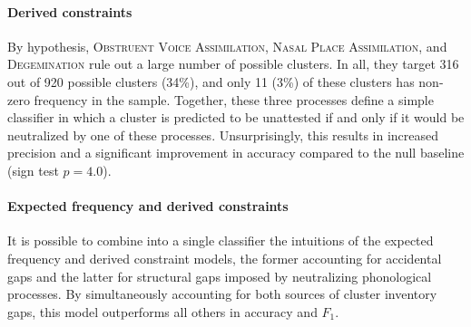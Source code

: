 \paragraph{Derived constraints} 
By hypothesis, \textsc{Obstruent Voice Assimilation}, \textsc{Nasal Place Assimilation}, and \textsc{Degemination} rule out a large number of possible clusters. 
In all, they target 316 out of 920 possible clusters (34\%), and only 11 (3\%) of these clusters has non-zero frequency in the sample.
Together, these three processes define a simple classifier in which a cluster is predicted to be unattested if and only if it would be neutralized by one of these processes. 
Unsurprisingly, this results in increased precision and a significant improvement in accuracy compared to the null baseline (sign test $p = 4.0$). 

\paragraph{Expected frequency and derived constraints}
It is possible to combine into a single classifier the intuitions of the expected frequency and derived constraint models, the former accounting for accidental gaps and the latter for structural gaps imposed by neutralizing phonological processes.
By simultaneously accounting for both sources of cluster inventory gaps, this model outperforms all others in accuracy and $F_1$. 

